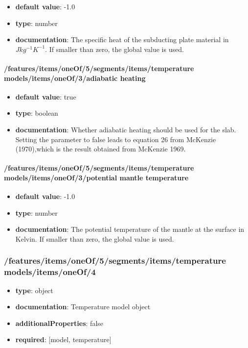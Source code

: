 \begin{itemize}\item {\bf default value}: -1.0
\item {\bf type}: number
\item {\bf documentation}: The specific heat of the subducting plate material in $J kg^{-1} K^{-1}$. If smaller than zero, the global value is used.
\end{itemize}\paragraph{/features/items/oneOf/5/segments/items/temperature models/items/oneOf/3/adiabatic heating}
\begin{itemize}\item {\bf default value}: true
\item {\bf type}: boolean
\item {\bf documentation}: Whether adiabatic heating should be used for the slab. Setting the parameter to false leads to equation 26 from McKenzie (1970),which is the result obtained from McKenzie 1969.
\end{itemize}\paragraph{/features/items/oneOf/5/segments/items/temperature models/items/oneOf/3/potential mantle temperature}
\begin{itemize}\item {\bf default value}: -1.0
\item {\bf type}: number
\item {\bf documentation}: The potential temperature of the mantle at the surface in Kelvin. If smaller than zero, the global value is used.
\end{itemize}\subsubsection{/features/items/oneOf/5/segments/items/temperature models/items/oneOf/4}
\begin{itemize}\item {\bf type}: object
\item {\bf documentation}: Temperature model object
\item {\bf additionalProperties}: false
\item {\bf required}: [model, temperature]\end{itemize}
